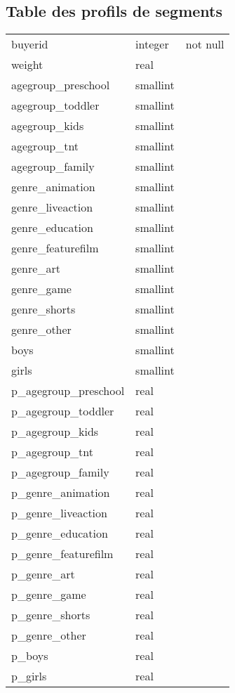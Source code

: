\documentclass[a4paper,11pt]{article}
\begin{document}
\subsection{Table des profils de segments}

\begin{tabular}{lll}
buyerid              & integer  & not null \\
 weight               & real    & \\ 
 agegroup\_preschool   & smallint & \\ 
 agegroup\_toddler     & smallint & \\ 
 agegroup\_kids        & smallint & \\ 
 agegroup\_tnt         & smallint & \\ 
 agegroup\_family      & smallint & \\ 
 genre\_animation      & smallint & \\ 
 genre\_liveaction     & smallint & \\ 
 genre\_education      & smallint & \\ 
 genre\_featurefilm    & smallint & \\ 
 genre\_art            & smallint & \\ 
 genre\_game           & smallint & \\ 
 genre\_shorts         & smallint & \\ 
 genre\_other          & smallint & \\ 
 boys                 & smallint & \\ 
 girls                & smallint & \\ 
 p\_agegroup\_preschool & real     & \\ 
 p\_agegroup\_toddler   & real     & \\ 
 p\_agegroup\_kids      & real     & \\ 
 p\_agegroup\_tnt       & real     & \\ 
 p\_agegroup\_family    & real     & \\ 
 p\_genre\_animation    & real     & \\ 
 p\_genre\_liveaction   & real     & \\ 
 p\_genre\_education    & real     & \\ 
 p\_genre\_featurefilm  & real     & \\ 
 p\_genre\_art          & real     & \\ 
 p\_genre\_game         & real     & \\ 
 p\_genre\_shorts       & real     & \\ 
 p\_genre\_other        & real     & \\ 
 p\_boys               & real     & \\ 
 p\_girls              & real     & 
\end{tabular}
\end{document}

